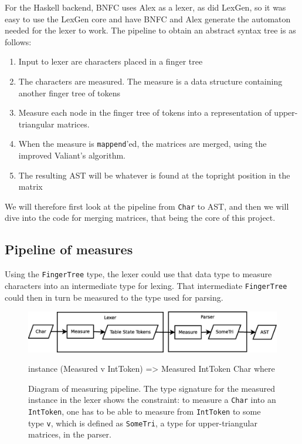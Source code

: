 \documentclass[a4paper,12pt,notitlepage]{report}
\begin{document}
For the Haskell backend, BNFC uses Alex as a lexer, as did LexGen, so it was
easy to use the LexGen core and have BNFC and Alex generate the automaton needed
for the lexer to work. The pipeline to obtain an abstract syntax tree is as
follows:

\begin{enumerate}
    \item Input to lexer are characters placed in a finger tree
    \item The characters are measured. The measure is a data structure containing
          another finger tree of tokens
    \item Measure each node in the finger tree of tokens into a representation
          of upper-triangular matrices.
    \item When the measure is \texttt{mappend}'ed, the matrices are merged,
          using the improved Valiant's algorithm.
    \item The resulting AST will be whatever is found at the topright position
          in the matrix
\end{enumerate}
We will therefore first look at the pipeline from \texttt{Char} to AST, and then
we will dive into the code for merging matrices, that being the core of this
project. 

\subsection{Pipeline of measures}
\label{pipeline}
Using the \texttt{FingerTree} type, the lexer could use that data type to
measure characters into an intermediate type for lexing. That intermediate
\texttt{FingerTree} could then in turn be measured to the type used for parsing.

\begin{figure}[H]
\includegraphics[width=\textwidth]{pipeline.eps}
\begin{code}
instance (Measured v IntToken) => Measured IntToken Char where
\end{code}
\caption{\label{pipelinedia}Diagram of measuring pipeline. The type signature
for the measured instance in the lexer shows the constraint: to measure a
\texttt{Char} into an \texttt{IntToken}, one has to be able to measure from
\texttt{IntToken} to some type \texttt{v}, which is defined as \texttt{SomeTri},
a type for upper-triangular matrices, in the parser.}
\end{figure}
\end{document}
